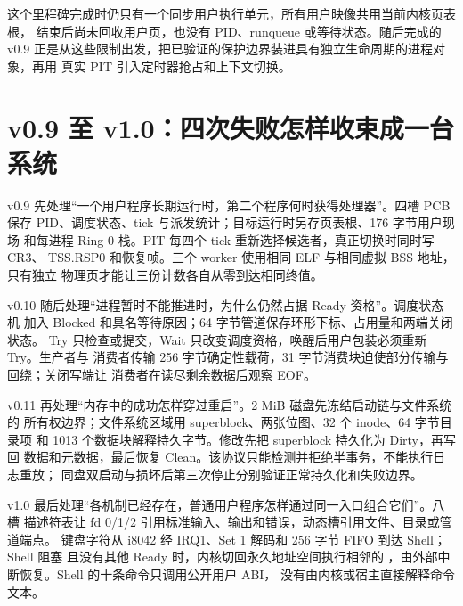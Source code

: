 这个里程碑完成时仍只有一个同步用户执行单元，所有用户映像共用当前内核页表根，
结束后尚未回收用户页，也没有 PID、runqueue 或等待状态。随后完成的 v0.9
正是从这些限制出发，把已验证的保护边界装进具有独立生命周期的进程对象，再用
真实 PIT 引入定时器抢占和上下文切换。

\section*{v0.9 至 v1.0：四次失败怎样收束成一台系统}

v0.9 先处理“一个用户程序长期运行时，第二个程序何时获得处理器”。四槽 PCB
保存 PID、调度状态、tick 与派发统计；目标运行时另存页表根、176 字节用户现场
和每进程 Ring 0 栈。PIT 每四个 tick 重新选择候选者，真正切换时同时写 CR3、
TSS.RSP0 和恢复帧。三个 worker 使用相同 ELF 与相同虚拟 BSS 地址，只有独立
物理页才能让三份计数各自从零到达相同终值。

v0.10 随后处理“进程暂时不能推进时，为什么仍然占据 Ready 资格”。调度状态机
加入 Blocked 和具名等待原因；64 字节管道保存环形下标、占用量和两端关闭状态。
Try 只检查或提交，Wait 只改变调度资格，唤醒后用户包装必须重新 Try。生产者与
消费者传输 256 字节确定性载荷，31 字节消费块迫使部分传输与回绕；关闭写端让
消费者在读尽剩余数据后观察 EOF。

v0.11 再处理“内存中的成功怎样穿过重启”。2 MiB 磁盘先冻结启动链与文件系统的
所有权边界；文件系统区域用 superblock、两张位图、32 个 inode、64 字节目录项
和 1013 个数据块解释持久字节。修改先把 superblock 持久化为 Dirty，再写回
数据和元数据，最后恢复 Clean。该协议只能检测并拒绝半事务，不能执行日志重放；
同盘双启动与损坏后第三次停止分别验证正常持久化和失败边界。

v1.0 最后处理“各机制已经存在，普通用户程序怎样通过同一入口组合它们”。八槽
描述符表让 fd 0/1/2 引用标准输入、输出和错误，动态槽引用文件、目录或管道端点。
键盘字符从 i8042 经 IRQ1、Set 1 解码和 256 字节 FIFO 到达 Shell；Shell 阻塞
且没有其他 Ready 时，内核切回永久地址空间执行相邻的
，由外部中断恢复。Shell 的十条命令只调用公开用户 ABI，
没有由内核或宿主直接解释命令文本。

